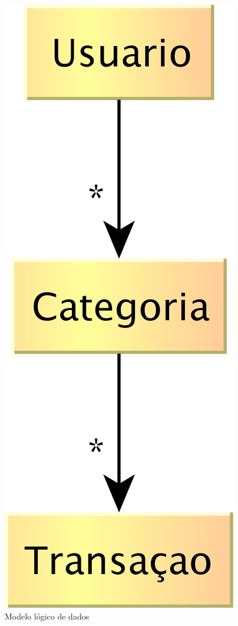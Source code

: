 \documentclass[12pt]{article}
\begin{document}
\begin{figure}[H]
\centering
  \label{modelo-fig}
  \includegraphics[scale=0.1, bb=0 0 449 1183]{./modelo.png}
  \caption{Modelo lógico de dados}
\end{figure}
\end{document}

